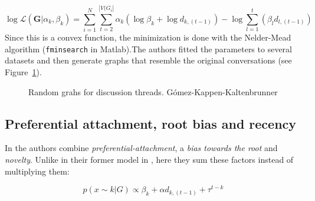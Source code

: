 \documentclass[smallextended]{svjour3}          %
\begin{document}
\begin{equation}
\log \mathcal{L}(\mathbf{G} | \alpha_k, \beta_k)
=
\sum_{i=1}^{N}
\sum_{t=2}^{|V(G_i|}
\alpha_k (\log \beta_k+ \log d_{k,(t-1)}) 
-
\log \sum_{l=1}^{t} (\beta_l d_{l,(t-1)})
\end{equation}
Since this is a convex function, the minimization is done with the Nelder-Mead algorithm (\texttt{fminsearch} in Matlab).The authors fitted the parameters to several datasets and then generate graphs that resemble the original conversations (see Figure~\ref{fig:Gomez}).

	\begin{figure}
		\centering
		\hfill
		\caption{Random grahs for discussion threads. Gómez-Kappen-Kaltenbrunner}
		\label{fig:Gomez}
	\end{figure}


\subsection{Preferential attachment, root bias and recency}
In \cite{Gomez2012} the authors combine \textit{preferential-attachment}, a \textit{bias towards the root} and \textit{novelty}. Unlike in their former model in \cite{Gomez2010}, here they sum these factors instead of multiplying them:

\begin{equation}
p(x \sim k | G) 
\propto 
\beta_k + \alpha d_{k, (t-1)} + \tau^{t-k}
\end{equation}
\end{document}
